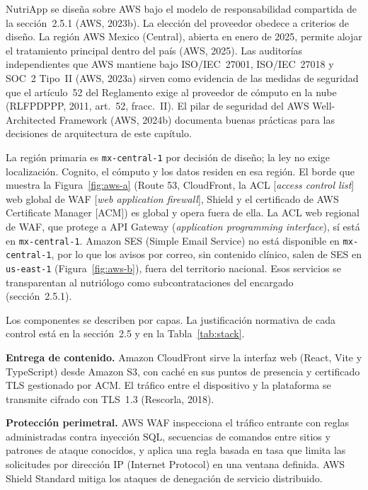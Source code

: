 \documentclass[12pt, a4paper]{article}
\begin{document}
NutriApp se diseña sobre AWS bajo el modelo de
responsabilidad compartida de la sección~2.5.1 (AWS, 2023b). La elección
del proveedor obedece a criterios de diseño. La región AWS Mexico
(Central), abierta en enero de 2025, permite alojar el tratamiento
principal dentro del país (AWS, 2025). Las auditorías independientes
que AWS mantiene bajo ISO/IEC~27001, ISO/IEC~27018 y SOC~2 Tipo~II
(AWS, 2023a) sirven como evidencia de las medidas de seguridad que el
artículo~52 del Reglamento exige al proveedor de cómputo en la nube
(RLFPDPPP, 2011, art.~52, fracc.~II). El pilar de seguridad del AWS
Well-Architected Framework (AWS, 2024b) documenta buenas prácticas para las
decisiones de arquitectura de este capítulo.

La región primaria es \texttt{mx-central-1} por decisión de diseño; la
ley no exige localización. Cognito, el cómputo y los datos residen en
esa región. El borde que muestra la Figura~\ref{fig:aws-a} (Route 53,
CloudFront, la ACL [\textit{access control list}] web global de WAF [\textit{web application firewall}], Shield y el certificado de AWS Certificate Manager [ACM]) es
global y opera fuera de ella. La ACL web regional de WAF, que protege a
API Gateway (\textit{application programming interface}), sí está en \texttt{mx-central-1}. Amazon SES (Simple Email Service) no está
disponible en \texttt{mx-central-1}, por lo que los avisos por correo,
sin contenido clínico, salen de SES en \texttt{us-east-1}
(Figura~\ref{fig:aws-b}), fuera del territorio nacional. Esos servicios
se transparentan al nutriólogo como subcontrataciones del encargado
(sección~2.5.1).

Los componentes se describen por capas. La justificación normativa de
cada control está en la sección~2.5 y en la Tabla~\ref{tab:stack}.

\textbf{Entrega de contenido.} Amazon CloudFront sirve la interfaz web
(React, Vite y TypeScript) desde Amazon S3, con caché en sus puntos de
presencia y certificado TLS gestionado por ACM. El
tráfico entre el dispositivo y la plataforma se transmite cifrado con
TLS~1.3 (Rescorla, 2018).

\textbf{Protección perimetral.} AWS WAF inspecciona el tráfico entrante
con reglas administradas contra inyección SQL, secuencias de comandos
entre sitios y patrones de ataque conocidos, y aplica una regla basada
en tasa que limita las solicitudes por dirección IP (Internet Protocol) en una ventana
definida. AWS Shield Standard mitiga los ataques de denegación de
servicio distribuido.
\end{document}
